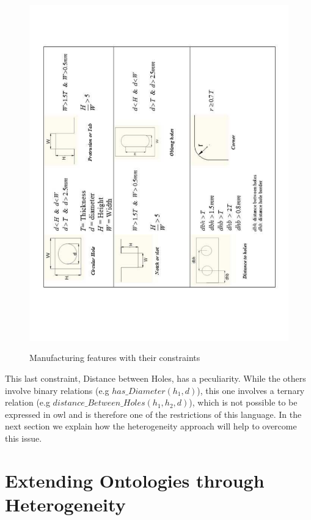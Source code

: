\begin{figure}
\includegraphics[scale=0.5, angle=-90]{figure-chapterIV/fig4-41}\\
\caption{Manufacturing features with their constraints}
\label{figure4-41}
\end{figure}



This last constraint, Distance between  Holes, has a peculiarity. While the others involve binary relations (e.g $has\_Diameter(h_{1},d)$), this one involves a ternary relation (e.g $distance\_Between\_Holes(h_{1},h_{2},d)$), which is not possible to be expressed in \gls{owl} and is therefore one of the restrictions of this language. In the next section we explain how the heterogeneity approach will help to overcome this issue. 


\section{Extending Ontologies through Heterogeneity}\label{section4.5}

